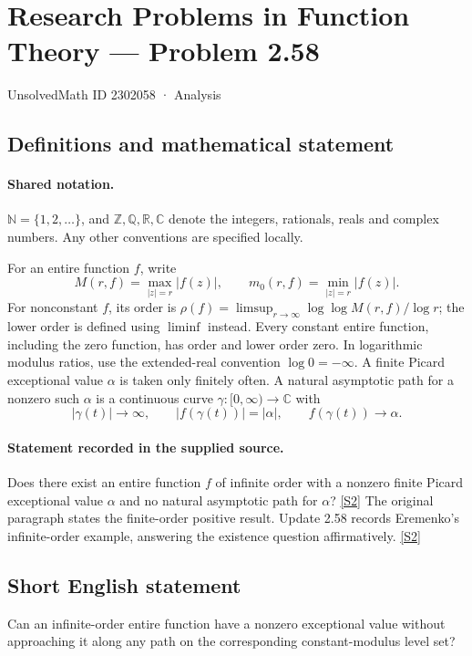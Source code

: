 \documentclass[11pt]{article}
\newcommand{\sref}[2]{\hyperlink{source:#1:#2}{[S#2]}}
\begin{document}
\setcounter{section}{2302057}
\section{Research Problems in Function Theory — Problem 2.58}\label{2302058}
{\small\sffamily UnsolvedMath ID 2302058 · Analysis}
\subsection{Definitions and mathematical statement}

\paragraph{Shared notation.}$\mathbb N=\{1,2,\ldots\}$, and $\mathbb Z,\mathbb Q,\mathbb R,\mathbb C$ denote the integers, rationals, reals and complex numbers. Any other conventions are specified locally.


For an entire function $f$, write
\[
 M(r,f)=\max_{|z|=r}|f(z)|,\qquad m_0(r,f)=\min_{|z|=r}|f(z)|.
\]
For nonconstant $f$, its order is $\rho(f)=\limsup_{r\to\infty}\log\log M(r,f)/\log r$;
the lower order is defined using $\liminf$ instead. Every constant entire function, including the zero function, has order and lower order zero. In logarithmic modulus ratios, use the extended-real convention $\log0=-\infty$.
A finite Picard exceptional value $\alpha$ is taken only finitely often. A natural asymptotic path for a nonzero such $\alpha$ is a continuous curve $\gamma:[0,\infty)\to\mathbb C$ with
\[|\gamma(t)|\to\infty,\qquad |f(\gamma(t))|=|\alpha|,\qquad f(\gamma(t))\to\alpha.\]

\paragraph{Statement recorded in the supplied source.}
Does there exist an entire function $f$ of infinite order with a nonzero finite Picard exceptional value $\alpha$ and no natural asymptotic path for $\alpha$? \sref{2302058}{2}
The original paragraph states the finite-order positive result. Update 2.58 records Eremenko's infinite-order example, answering the existence question affirmatively. \sref{2302058}{2}
\subsection{Short English statement}
Can an infinite-order entire function have a nonzero exceptional value without approaching it along any path on the corresponding constant-modulus level set?
\end{document}
